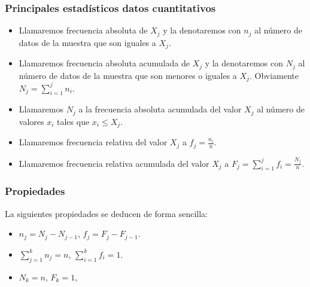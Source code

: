 \begin{frame}
\frametitle{Principales estadísticos datos cuantitativos}
\begin{itemize}
\item Llamaremos frecuencia absoluta de $X_j$  y la denotaremos con $n_j$ al número de datos de la muestra que son iguales a $X_j$.
\item Llamaremos frecuencia absoluta acumulada de $X_j$  y la denotaremos con $N_j$ al número de datos de la muestra que son menores o iguales a $X_j$. Obviamente $N_j=\sum_{i=1}^j n_i$.
\item Llamaremos $N_j$ a la frecuencia absoluta acumulada del valor $X_j$ al número de valores $x_i$ tales que  $x_i\leq X_j$.
\item Llamaremos frecuencia relativa  del valor $X_j$ a $f_j=\frac{n_i}{n}$.
\item Llamaremos frecuencia relativa acumulada del valor $X_j$ a $F_j=\sum_{i=1}^j f_i=\frac{N_j}{n}$.
\end{itemize}
\end{frame}


\begin{frame}
\frametitle{Propiedades}

La siguientes propiedades se deducen de forma sencilla:

\begin{itemize}
\item $n_j=N_j-N_{j-1}$, $f_j=F_j-F_{j-1}$.
\item $\sum_{j=1}^k n_j=n$, $\sum_{i=1}^k f_i=1$.
\item $N_k=n$, $F_k=1$, 
\end{itemize}
\end{frame}

